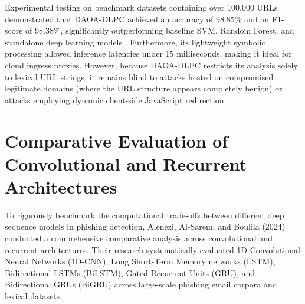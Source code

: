 Experimental testing on benchmark datasets containing over 100,000 URLs demonstrated that DAOA-DLPC achieved an accuracy of 98.85\% and an F1-score of 98.38\%, significantly outperforming baseline SVM, Random Forest, and standalone deep learning models \cite{3}. Furthermore, its lightweight symbolic processing allowed inference latencies under 15 milliseconds, making it ideal for cloud ingress proxies. However, because DAOA-DLPC restricts its analysis solely to lexical URL strings, it remains blind to attacks hosted on compromised legitimate domains (where the URL structure appears completely benign) or attacks employing dynamic client-side JavaScript redirection.

\section{Comparative Evaluation of Convolutional and Recurrent Architectures}
To rigorously benchmark the computational trade-offs between different deep sequence models in phishing detection, Alenezi, Al-Sarem, and Boulila (2024) \cite{4} conducted a comprehensive comparative analysis across convolutional and recurrent architectures. Their research systematically evaluated 1D Convolutional Neural Networks (1D-CNN), Long Short-Term Memory networks (LSTM), Bidirectional LSTMs (BiLSTM), Gated Recurrent Units (GRU), and Bidirectional GRUs (BiGRU) across large-scale phishing email corpora and lexical datasets.

